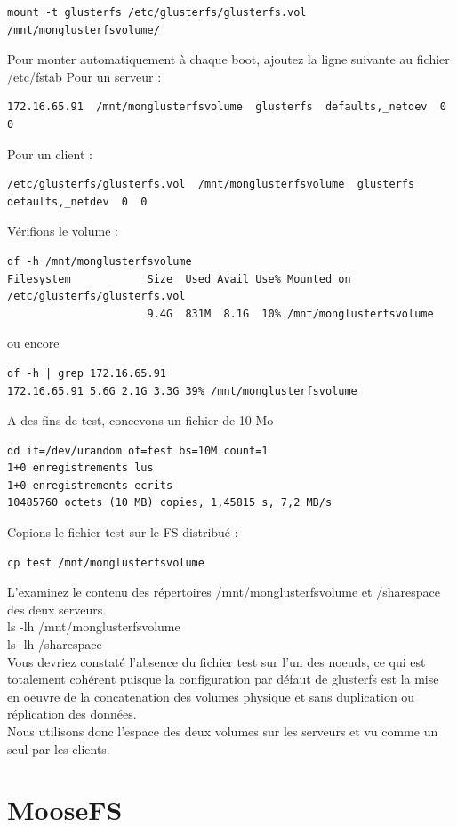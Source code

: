 \documentclass[12pt]{report}
\begin{document}
\begin{lstlisting}
mount -t glusterfs /etc/glusterfs/glusterfs.vol /mnt/monglusterfsvolume/
	  \end{lstlisting}
Pour monter automatiquement à chaque boot, ajoutez la ligne suivante au fichier /etc/fstab
Pour un serveur :
\begin{lstlisting}
172.16.65.91  /mnt/monglusterfsvolume  glusterfs  defaults,_netdev  0  0
	  \end{lstlisting}
Pour un client :
\begin{lstlisting}
/etc/glusterfs/glusterfs.vol  /mnt/monglusterfsvolume  glusterfs  defaults,_netdev  0  0
	  \end{lstlisting}
Vérifions le volume :
\begin{lstlisting}
df -h /mnt/monglusterfsvolume
Filesystem            Size  Used Avail Use% Mounted on
/etc/glusterfs/glusterfs.vol
                      9.4G  831M  8.1G  10% /mnt/monglusterfsvolume
	  \end{lstlisting}
ou encore
\begin{lstlisting}
df -h | grep 172.16.65.91
172.16.65.91 5.6G 2.1G 3.3G 39% /mnt/monglusterfsvolume
	  \end{lstlisting}
A des fins de test, concevons un fichier de 10 Mo
\begin{lstlisting}
dd if=/dev/urandom of=test bs=10M count=1
1+0 enregistrements lus
1+0 enregistrements ecrits
10485760 octets (10 MB) copies, 1,45815 s, 7,2 MB/s
	  \end{lstlisting}
Copions le fichier test sur le FS distribué :
\begin{lstlisting}
cp test /mnt/monglusterfsvolume
	  \end{lstlisting}
L'examinez le contenu des répertoires /mnt/monglusterfsvolume et /sharespace des deux serveurs.\\
ls -lh /mnt/monglusterfsvolume\\
ls -lh /sharespace\\
Vous devriez constaté l'absence du fichier test sur l'un des noeuds, ce qui est totalement cohérent puisque la configuration par défaut de glusterfs est la mise en oeuvre de la concatenation des volumes physique et sans duplication ou réplication des données.\\
Nous utilisons donc l'espace des deux volumes sur les serveurs et vu comme un seul par les clients.
	\chapter{MooseFS}
\end{document}
